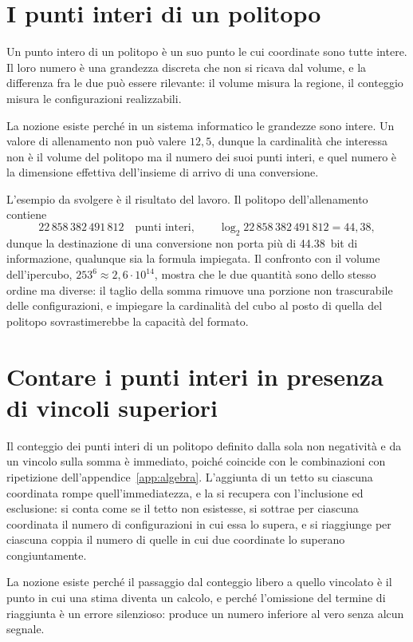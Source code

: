 \section{I punti interi di un politopo}

Un punto intero di un politopo è un suo punto le cui coordinate sono tutte intere. Il loro numero è una grandezza discreta che non si ricava dal volume, e la differenza fra le due può essere rilevante: il volume misura la regione, il conteggio misura le configurazioni realizzabili.

La nozione esiste perché in un sistema informatico le grandezze sono intere. Un valore di allenamento non può valere $12{,}5$, dunque la cardinalità che interessa non è il volume del politopo ma il numero dei suoi punti interi, e quel numero è la dimensione effettiva dell'insieme di arrivo di una conversione.

L'esempio da svolgere è il risultato del lavoro. Il politopo dell'allenamento contiene
\begin{equation}
22\,858\,382\,491\,812 \quad\text{punti interi}, \qquad \log_2 22\,858\,382\,491\,812 = 44{,}38 ,
\end{equation}
dunque la destinazione di una conversione non porta più di \SI{44,38}{bit} di informazione, qualunque sia la formula impiegata. Il confronto con il volume dell'ipercubo, $253^6 \approx 2{,}6 \cdot 10^{14}$, mostra che le due quantità sono dello stesso ordine ma diverse: il taglio della somma rimuove una porzione non trascurabile delle configurazioni, e impiegare la cardinalità del cubo al posto di quella del politopo sovrastimerebbe la capacità del formato.

\section{Contare i punti interi in presenza di vincoli superiori}

Il conteggio dei punti interi di un politopo definito dalla sola non negatività e da un vincolo sulla somma è immediato, poiché coincide con le combinazioni con ripetizione dell'appendice~\ref{app:algebra}. L'aggiunta di un tetto su ciascuna coordinata rompe quell'immediatezza, e la si recupera con l'inclusione ed esclusione: si conta come se il tetto non esistesse, si sottrae per ciascuna coordinata il numero di configurazioni in cui essa lo supera, e si riaggiunge per ciascuna coppia il numero di quelle in cui due coordinate lo superano congiuntamente.

La nozione esiste perché il passaggio dal conteggio libero a quello vincolato è il punto in cui una stima diventa un calcolo, e perché l'omissione del termine di riaggiunta è un errore silenzioso: produce un numero inferiore al vero senza alcun segnale.

